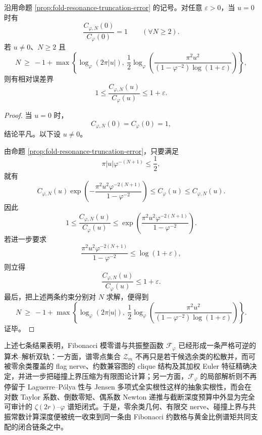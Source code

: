 \begin{corollary}[共振梯截断深度的相对误差预算]\label{cor:xi-time-part71-resonance-truncation-relative-error-budget}
沿用命题 \ref{prop:fold-resonance-truncation-error} 的记号。对任意 \(\varepsilon>0\)，当 \(u=0\) 时有
\[
\frac{C_{\varphi,N}(0)}{C_\varphi(0)}=1
\qquad
(\forall N\ge 2).
\]
若 \(u\neq 0\)、\(N\ge 2\) 且
\[
N\ \ge\
-1+\max\!\left\{
\log_\varphi(2\pi|u|),\
\frac12\log_\varphi\!\left(
\frac{\pi^2u^2}{(1-\varphi^{-2})\log(1+\varepsilon)}
\right)
\right\},
\]
则有相对误差界
\[
1\le \frac{C_{\varphi,N}(u)}{C_\varphi(u)}\le 1+\varepsilon.
\]
\end{corollary}
\begin{proof}
当 \(u=0\) 时，
\[
C_{\varphi,N}(0)=C_\varphi(0)=1,
\]
结论平凡。以下设 \(u\neq 0\)。

由命题 \ref{prop:fold-resonance-truncation-error}，只要满足
\[
\pi|u|\varphi^{-(N+1)}\le \frac12,
\]
就有
\[
C_{\varphi,N}(u)\exp\!\left(
-\frac{\pi^2u^2\varphi^{-2(N+1)}}{1-\varphi^{-2}}
\right)
\le
C_\varphi(u)
\le
C_{\varphi,N}(u).
\]
因此
\[
1
\le
\frac{C_{\varphi,N}(u)}{C_\varphi(u)}
\le
\exp\!\left(
\frac{\pi^2u^2\varphi^{-2(N+1)}}{1-\varphi^{-2}}
\right).
\]
若进一步要求
\[
\frac{\pi^2u^2\varphi^{-2(N+1)}}{1-\varphi^{-2}}
\le
\log(1+\varepsilon),
\]
则立得
\[
\frac{C_{\varphi,N}(u)}{C_\varphi(u)}\le 1+\varepsilon.
\]
最后，把上述两条约束分别对 \(N\) 求解，便得到
\[
N\ \ge\
-1+\max\!\left\{
\log_\varphi(2\pi|u|),\
\frac12\log_\varphi\!\left(
\frac{\pi^2u^2}{(1-\varphi^{-2})\log(1+\varepsilon)}
\right)
\right\}.
\]
证毕。
\end{proof}

\noindent
上述七条结果表明，Fibonacci 模零谱与共振整函数 \(\mathcal F_\varphi\) 已经形成一条严格可逆的算术--解析双轨：一方面，谱零点集合 \(\mathcal Z_m\) 不再只是若干候选余类的松散并，而可被零余类覆盖的 flag nerve、约数兼容图的 clique 结构及其加权 Euler 特征精确决定，并进一步把碰撞上界压缩为有限图论计算；另一方面，\(\mathcal F_\varphi\) 的局部解析则不再停留于 Laguerre--P\'olya 性与 Jensen 多项式全实根性这样的抽象实根性，而会在对数 Taylor 系数、倒数零矩、偶系数 Newton 递推与截断深度预算中外显为完全可审计的 \(\zeta(2r)\)--\(\varphi\) 谱矩闭式。于是，零余类几何、有限交 nerve、碰撞上界与共振常数计算深度便被统一收束到同一条由 Fibonacci 约数格与黄金比例谱矩共同支配的闭合链条之中。



\endinput
